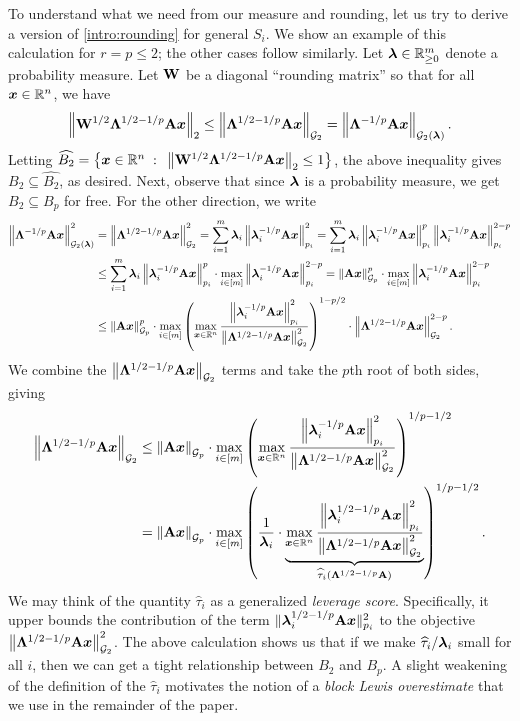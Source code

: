 \documentclass[11pt]{article}
\numberwithin{equation}{section}
\begin{document}
To understand what we need from our measure and rounding, let us try to derive a version of \eqref{intro:rounding} for general $S_i$. We show an example of this calculation for $r = p \le 2$; the other cases follow similarly. Let $\bm{\lambda} \in \mathbb{R}^m_{\ge 0}$ denote a probability measure. Let $\mathbf{W}$ be a diagonal ``rounding matrix'' so that for all $\bm{x} \in \mathbb{R}^n$, we have
\begin{align*}
    \left\lVert \mathbf{W}^{1/2}\mathbf{\Lambda}^{1/2-1/p}\mathbf{A}\bm{x} \right\rVert_2 \le \left\lVert \mathbf{\Lambda}^{1/2-1/p}\mathbf{A}\bm{x} \right\rVert_{\mathcal{G}_{2}} = \left\lVert \mathbf{\Lambda}^{-1/p}\mathbf{A}\bm{x} \right\rVert_{\mathcal{G}_{2}(\bm{\lambda})}.
\end{align*}
Letting $\widehat{B_2} = \left\{\bm{x}\in\mathbb{R}^n{\;\; : \;\;} \left\lVert \mathbf{W}^{1/2}\mathbf{\Lambda}^{1/2-1/p}\mathbf{A}\bm{x} \right\rVert_2 \le 1\right\}$, the above inequality gives $B_2 \subseteq \widehat{B_2}$, as desired. Next, observe that since $\bm{\lambda}$ is a probability measure, we get $B_2 \subseteq B_p$ for free. For the other direction, we write
\begin{align*}
    \left\lVert \mathbf{\Lambda}^{-1/p}\mathbf{A}\bm{x} \right\rVert_{\mathcal{G}_{2}(\bm{\lambda})}^2 &= \left\lVert \mathbf{\Lambda}^{1/2-1/p}\mathbf{A}\bm{x} \right\rVert_{\mathcal{G}_{2}}^2 = \sum_{i=1}^m \bm{\lambda}_i\left\lVert \bm{\lambda}_i^{-1/p}\mathbf{A}\bm{x} \right\rVert_{p_i}^2 = \sum_{i=1}^m \bm{\lambda}_i\left\lVert \bm{\lambda}_i^{-1/p}\mathbf{A}\bm{x} \right\rVert_{p_i}^{p}\left\lVert \bm{\lambda}_i^{-1/p}\mathbf{A}\bm{x} \right\rVert_{p_i}^{2-p} \\
    &\le \sum_{i=1}^m \bm{\lambda}_i\left\lVert \bm{\lambda}_i^{-1/p}\mathbf{A}\bm{x} \right\rVert_{p_i}^{p} \cdot \max_{i \in [m]} \left\lVert \bm{\lambda}_i^{-1/p}\mathbf{A}\bm{x} \right\rVert_{p_i}^{2-p} = \left\lVert \mathbf{A}\bm{x} \right\rVert_{\mathcal{G}_{p}}^p \cdot \max_{i \in [m]} \left\lVert \bm{\lambda}_i^{-1/p}\mathbf{A}\bm{x} \right\rVert_{p_i}^{2-p} \\
    &\le \left\lVert \mathbf{A}\bm{x} \right\rVert_{\mathcal{G}_{p}}^p \cdot \max_{i \in [m]} \left(\max_{\bm{x} \in \mathbb{R}^n} \frac{\left\lVert \bm{\lambda}_i^{-1/p}\mathbf{A}\bm{x} \right\rVert_{p_i}^{2}}{\left\lVert \mathbf{\Lambda}^{1/2-1/p}\mathbf{A}\bm{x} \right\rVert_{\mathcal{G}_{2}}^2}\right)^{1-p/2} \cdot \left\lVert \mathbf{\Lambda}^{1/2-1/p}\mathbf{A}\bm{x} \right\rVert_{\mathcal{G}_{2}}^{2-p}.
\end{align*}
We combine the $\left\lVert \mathbf{\Lambda}^{1/2-1/p}\mathbf{A}\bm{x} \right\rVert_{\mathcal{G}_{2}}$ terms and take the $p$th root of both sides, giving
\begin{align*}
    \left\lVert \mathbf{\Lambda}^{1/2-1/p}\mathbf{A}\bm{x} \right\rVert_{\mathcal{G}_{2}} &\le \left\lVert \mathbf{A}\bm{x} \right\rVert_{\mathcal{G}_{p}} \cdot \max_{i \in [m]} \left(\max_{\bm{x} \in \mathbb{R}^n} \frac{\left\lVert \bm{\lambda}_i^{-1/p}\mathbf{A}\bm{x} \right\rVert_{p_i}^{2}}{\left\lVert \mathbf{\Lambda}^{1/2-1/p}\mathbf{A}\bm{x} \right\rVert_{\mathcal{G}_{2}}^2}\right)^{1/p-1/2} \\
    &= \left\lVert \mathbf{A}\bm{x} \right\rVert_{\mathcal{G}_{p}} \cdot \max_{i \in [m]} \left(\frac{1}{\bm{\lambda}_i} \cdot \underbrace{\max_{\bm{x} \in \mathbb{R}^n} \frac{\left\lVert \bm{\lambda}_i^{1/2-1/p}\mathbf{A}\bm{x} \right\rVert_{p_i}^{2}}{\left\lVert \mathbf{\Lambda}^{1/2-1/p}\mathbf{A}\bm{x} \right\rVert_{\mathcal{G}_{2}}^2}}_{\widehat{\tau}_i(\mathbf{\Lambda}^{1/2-1/p}\mathbf{A})}\right)^{1/p-1/2}.
\end{align*}
We may think of the quantity $\widehat{\tau}_i$ as a generalized \textit{leverage score}. Specifically, it upper bounds the contribution of the term $\|\bm{\lambda}_i^{1/2-1/p}\mathbf{A}\bm{x}\|_{p_i}^{2}$ to the objective $\left\lVert \mathbf{\Lambda}^{1/2-1/p}\mathbf{A}\bm{x} \right\rVert_{\mathcal{G}_{2}}^2$. The above calculation shows us that if we make $\widehat{\tau}_i/\bm{\lambda}_i$ small for all $i$, then we can get a tight relationship between $B_2$ and $B_p$. A slight weakening of the definition of the $\widehat{\tau}_i$ motivates the notion of a \textit{block Lewis overestimate} that we use in the remainder of the paper.
\end{document}
